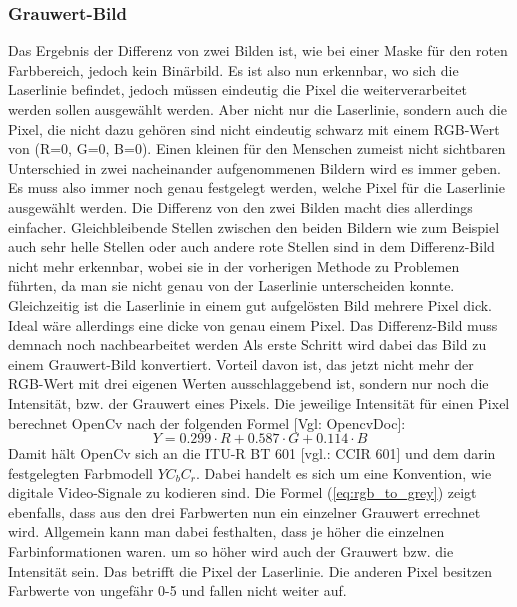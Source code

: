 		\subsubsection{Grauwert-Bild}
		Das Ergebnis der Differenz von zwei Bilden ist, wie bei einer Maske für den roten Farbbereich, jedoch kein Binärbild. Es ist also nun erkennbar, wo sich die Laserlinie befindet, jedoch müssen eindeutig die Pixel die weiterverarbeitet werden sollen ausgewählt werden. Aber nicht nur die Laserlinie, sondern auch die Pixel, die nicht dazu gehören sind nicht eindeutig schwarz mit einem RGB-Wert von (R=0, G=0, B=0). Einen kleinen für den Menschen zumeist nicht sichtbaren Unterschied in zwei nacheinander aufgenommenen Bildern wird es immer geben. Es muss also immer noch genau festgelegt werden, welche Pixel für die Laserlinie ausgewählt werden. Die Differenz von den zwei Bilden macht dies allerdings einfacher. Gleichbleibende Stellen zwischen den beiden Bildern wie zum Beispiel auch sehr helle Stellen oder auch andere rote Stellen sind in dem Differenz-Bild nicht mehr erkennbar, wobei sie in der vorherigen Methode zu Problemen führten, da man sie nicht genau von der Laserlinie unterscheiden konnte. Gleichzeitig ist die Laserlinie in einem gut aufgelösten Bild mehrere Pixel dick. Ideal wäre allerdings eine dicke von genau einem Pixel. Das Differenz-Bild muss demnach noch nachbearbeitet werden \newline
		Als erste Schritt wird dabei das Bild zu einem Grauwert-Bild konvertiert. Vorteil davon ist, das jetzt nicht mehr der RGB-Wert mit drei eigenen Werten ausschlaggebend ist, sondern nur noch die Intensität, bzw. der Grauwert eines Pixels. Die jeweilige Intensität für einen Pixel berechnet OpenCv nach der folgenden Formel [Vgl: OpencvDoc]:
		\begin{equation}
			Y = 0.299 \cdot R + 0.587 \cdot G + 0.114 \cdot B
			\label{eq:rgb_to_grey}
		\end{equation}
		Damit hält OpenCv sich an die ITU-R BT 601 [vgl.: CCIR 601] und dem darin festgelegten Farbmodell \( YC_bC_r \). Dabei handelt es sich um eine Konvention, wie digitale Video-Signale zu kodieren sind. \newline
		Die Formel (\ref{eq:rgb_to_grey}) zeigt ebenfalls, dass aus den drei Farbwerten nun ein einzelner Grauwert errechnet wird. Allgemein kann man dabei festhalten, dass je höher die einzelnen Farbinformationen waren. um so höher wird auch der Grauwert bzw. die Intensität sein. Das betrifft die Pixel der Laserlinie. Die anderen Pixel besitzen Farbwerte von ungefähr 0-5 und fallen nicht weiter auf. \newline
